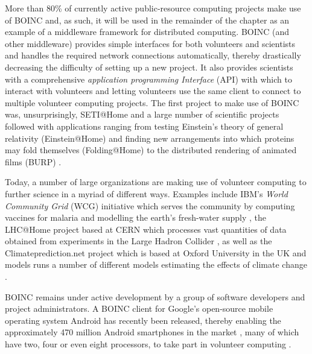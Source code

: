 More than 80\% of currently active public-resource computing projects make use of BOINC and, as such, it will be used in the remainder of the chapter as an example of a middleware framework for distributed computing. BOINC (and other middleware) provides simple interfaces for both volunteers and scientists and handles the required network connections automatically, thereby drastically decreasing the difficulty of setting up a new project. It also  provides scientists with a comprehensive \emph{application programming Interface} (API) with which to interact with volunteers and letting volunteers use the same client to connect to multiple volunteer computing projects. The first project to make use of BOINC was, unsurprisingly, SETI@Home and a large number of scientific projects followed with applications ranging from testing Einstein's theory of general relativity (Einstein@Home) \cite{eah} and finding new arrangements into which proteins may fold themselves (Folding@Home) \cite{fah} to the distributed rendering of animated films (BURP) \cite{burp}.

Today, a number of large organizations are making use of volunteer computing to further science in a myriad of different ways. Examples include IBM's \emph{World Community Grid} (WCG) initiative which serves the community by computing vaccines for malaria and modelling the earth's fresh-water supply \cite{wcg}, the LHC@Home project based at CERN which processes vast quantities of data obtained from experiments in the Large Hadron Collider \cite{lhcah}, as well as the Climateprediction.net project which is based at Oxford University in the UK and models runs a number of different models estimating the effects of climate change \cite{cpdn}.

BOINC remains under active development by a group of software developers and project administrators. A BOINC client for Google's open-source mobile operating system Android has recently been released, thereby enabling the approximately 470 million Android smartphones in the market \cite{mobithinking}, many of which have two, four or even eight processors,      to take part in volunteer computing \cite{android}.

